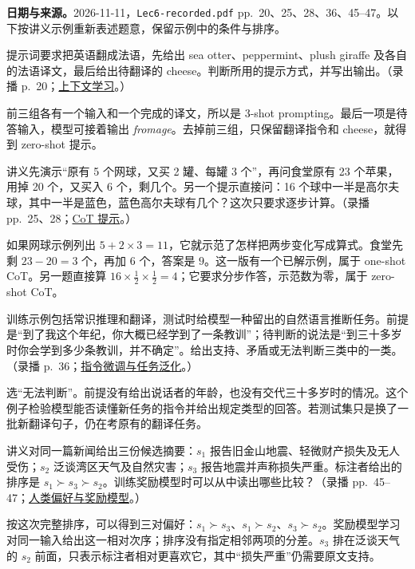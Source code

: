 \begingroup
\linespread{1.15}\selectfont
\setlength{\parskip}{0.4em}
\renewcommand{\recordid}[1]{}
\renewcommand{\relatedtopic}[2]{\hyperref[topic:#1]{#2}}

\textbf{日期与来源。}2026-11-11，\texttt{Lec6-recorded.pdf} pp.~20、25、28、36、45--47。以下按讲义示例重新表述题意，保留示例中的条件与排序。

提示词要求把英语翻成法语，先给出 sea otter、peppermint、plush giraffe 及各自的法语译文，最后给出待翻译的 cheese。判断所用的提示方式，并写出输出。（录播 p.~20；\relatedtopic{SC4002-L13-T01}{上下文学习}。）
\begin{workedsolution}
前三组各有一个输入和一个完成的译文，所以是 3-shot prompting。最后一项是待答输入，模型可接着输出 \textit{fromage}。去掉前三组，只保留翻译指令和 cheese，就得到 zero-shot 提示。
\end{workedsolution}

讲义先演示“原有 5 个网球，又买 2 罐、每罐 3 个”，再问食堂原有 23 个苹果，用掉 20 个，又买入 6 个，剩几个。另一个提示直接问：16 个球中一半是高尔夫球，其中一半是蓝色，蓝色高尔夫球有几个？这次只要求逐步计算。（录播 pp.~25、28；\relatedtopic{SC4002-L13-T01}{CoT 提示}。）
\begin{workedsolution}
\nopagebreak[4]
如果网球示例列出 $5+2\times3=11$，它就示范了怎样把两步变化写成算式。食堂先剩 $23-20=3$ 个，再加 $6$ 个，答案是 $9$。这一版有一个已解示例，属于 one-shot CoT。另一题直接算 $16\times\tfrac12\times\tfrac12=4$；它要求分步作答，示范数为零，属于 zero-shot CoT。
\end{workedsolution}

训练示例包括常识推理和翻译，测试时给模型一种留出的自然语言推断任务。前提是“到了我这个年纪，你大概已经学到了一条教训”；待判断的说法是“到三十多岁时你会学到多少条教训，并不确定”。给出支持、矛盾或无法判断三类中的一类。（录播 p.~36；\relatedtopic{SC4002-L13-T02}{指令微调与任务泛化}。）
\begin{workedsolution}
选“无法判断”。前提没有给出说话者的年龄，也没有交代三十多岁时的情况。这个例子检验模型能否读懂新任务的指令并给出规定类型的回答。若测试集只是换了一批新翻译句子，仍在考原有的翻译任务。
\end{workedsolution}

讲义对同一篇新闻给出三份候选摘要：$s_1$ 报告旧金山地震、轻微财产损失及无人受伤；$s_2$ 泛谈湾区天气及自然灾害；$s_3$ 报告地震并声称损失严重。标注者给出的排序是 $s_1\succ s_3\succ s_2$。训练奖励模型时可以从中读出哪些比较？（录播 pp.~45--47；\relatedtopic{SC4002-L13-T03}{人类偏好与奖励模型}。）
\begin{workedsolution}
按这次完整排序，可以得到三对偏好：$s_1\succ s_3$、$s_1\succ s_2$、$s_3\succ s_2$。奖励模型学习对同一输入给出这一相对次序；排序没有指定相邻两项的分差。$s_3$ 排在泛谈天气的 $s_2$ 前面，只表示标注者相对更喜欢它，其中“损失严重”仍需要原文支持。
\end{workedsolution}
\endgroup
